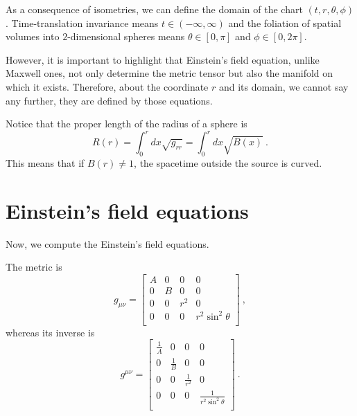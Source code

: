     As a consequence of isometries, we can define the domain of the chart $(t, r,\theta, \phi)$. Time-translation invariance means $t \in (-\infty, \infty)$ and the foliation of spatial volumes into $2$-dimensional spheres means $\theta \in [0, \pi]$ and $\phi \in [0, 2 \pi]$. 

    However, it is important to highlight that Einstein's field equation, unlike Maxwell ones, not only determine the metric tensor but also the manifold on which it exists. Therefore, about the coordinate $r$ and its domain, we cannot say any further, they are defined by those equations.

    Notice that the proper length of the radius of a sphere is
    \begin{equation*}
        R(r) = \int_0^r dx \sqrt{g_{rr}} = \int_0^r dx \sqrt{B(x)} ~.
    \end{equation*}
    This means that if $B(r) \neq 1$, the spacetime outside the source is curved. 

\section{Einstein's field equations}

    Now, we compute the Einstein's field equations. 

    The metric is 
    \begin{equation*}
        g_{\mu\nu} = \begin{bmatrix}
            A & 0 & 0 & 0 \\
            0 & B & 0 & 0 \\
            0 & 0 & r^2 & 0 \\
            0 & 0 & 0 & r^2 \sin^2 \theta \\
        \end{bmatrix} ~,
    \end{equation*}
    whereas its inverse is 
    \begin{equation*}
        g^{\mu\nu} = \begin{bmatrix}
            \frac{1}{A} & 0 & 0 & 0 \\
            0 & \frac{1}{B} & 0 & 0 \\
            0 & 0 & \frac{1}{r^2} & 0 \\
            0 & 0 & 0 & \frac{1}{r^2 \sin^2 \theta} \\
        \end{bmatrix} ~.
    \end{equation*}

